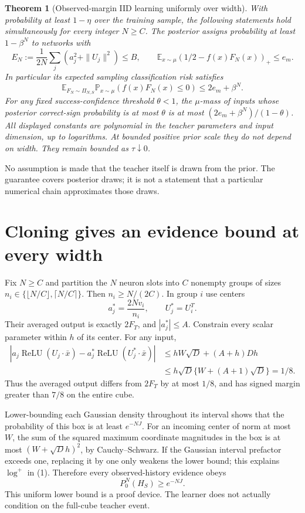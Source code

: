 \documentclass[11pt]{article}
\newtheorem{theorem}{Theorem}\newtheorem{corollary}[theorem]{Corollary}
\newcommand{\E}{\mathbb E}\newcommand{\R}{\mathbb R}
\newcommand{\relu}{\operatorname{ReLU}}\newcommand{\Prb}{\mathbb P}
\begin{document}
\begin{theorem}[Observed-margin IID learning uniformly over width]
With probability at least $1-\eta$ over the training sample, the following
statements hold simultaneously for every integer $N\ge C$.
The posterior assigns probability at least $1-\beta^N$ to networks with
\[
 E_N:=\frac1{2N}\sum_j(a_j^2+\|U_j\|^2)\le B,
 \qquad \E_{x\sim\mu}(1/2-f(x)F_N(x))_+\le e_m.           \tag{4}
\]
In particular its expected sampling classification risk satisfies
\[
 \E_{F_N\sim\Pi_{N,S}}\Prb_{x\sim\mu}(f(x)F_N(x)\le0)
                         \le2e_m+\beta^N.                \tag{5}
\]
For any fixed success-confidence threshold $\theta<1$, the $\mu$-mass
of inputs whose posterior correct-sign probability is at most $\theta$
is at most $(2e_m+\beta^N)/(1-\theta)$.
All displayed constants are polynomial in the teacher parameters and
input dimension, up to logarithms. At bounded positive prior scale they
do not depend on width. They remain bounded as $\tau\downarrow0$.
\end{theorem}
No assumption is made that the teacher itself is drawn from the prior.
The guarantee covers posterior draws; it is not a statement that a
particular numerical chain approximates those draws.

\section{Cloning gives an evidence bound at every width}
Fix $N\ge C$ and partition the $N$ neuron slots into $C$ nonempty groups
of sizes $n_i\in\{\lfloor N/C\rfloor,\lceil N/C\rceil\}$.
Then $n_i\ge N/(2C)$. In group $i$ use centers
\[
             a_j^*=\frac{2Nv_i}{n_i},\qquad U_j^*=U_i^T.
\]
Their averaged output is exactly $2F_T$, and $|a_j^*|\le A$.
Constrain every scalar parameter within $h$ of its center. For any input,
\begin{align*}
 |a_j\relu(U_j\cdot\bar x)-a_j^*\relu(U_j^*\cdot\bar x)|
 &\le hW\sqrt D+(A+h)Dh\\
 &\le h\sqrt D\{W+(A+1)\sqrt D\}=1/8.
\end{align*}
Thus the averaged output differs from $2F_T$ by at most $1/8$,
and has signed margin greater than $7/8$ on the entire cube.

Lower-bounding each Gaussian density throughout its interval shows that
the probability of this box is at least $e^{-NJ}$. For an incoming
center of norm at most $W$, the sum of the squared maximum coordinate
magnitudes in the box is at most $(W+\sqrt D h)^2$, by Cauchy--Schwarz.
If the Gaussian interval prefactor exceeds one, replacing it by one
only weakens the lower bound; this explains $\log^+$ in (1).
Therefore every observed-history evidence obeys
\[
                    P_0^N(H_S)\ge e^{-NJ}.               \tag{6}
\]
This uniform lower bound is a proof device. The learner does not actually
condition on the full-cube teacher event.
\end{document}
